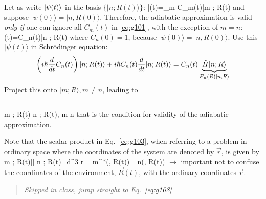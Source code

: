 \documentclass[12pt]{article}
\begin{document}
Let as write $\ket{\psi(t)}$ in the basis $\{|n ; R(t)\rangle\}$:
\be
|\psi(t)\rangle=\sum_{m} C_{m}(t)|m ; R(t)\rangle
\label{eq:g101}
\ee
and suppose $|\psi(0)\rangle=|n, R(0)\rangle$. Therefore, the
adiabatic approximation is valid \textit{only if} one
can ignore all $C_m(t)$ in \eqref{eq:g101}, with the exception
of $m=n$:
\be
|\psi(t)\rangle=C_{n}(t)|n ; R(t)\rangle
\ee
where $C_n(0)=1$, because $|\psi(0)\rangle=|n, R(0)\rangle$.
Use this $|\psi(t)\rangle$ in Schrödinger equation:%
\[
\left(i \hbar \frac{d}{d t} C_{n}(t)\right)
|n ; R(t)\rangle+i \hbar C_{n}(t) \frac{d}{d t}|n ; R(t)\rangle=
C_{n}(t) \underbrace{\hat{H}|n ; R\rangle}%
_{E_n(R)\ket{n,R}}
\]
Project this onto $|m ; R\rangle, m \neq n$,
leading to\\
\rule{\textwidth}{1pt}
\be
\left\langle m ; R(t) \mid {} \mid n ; R(t)\right{}, \quad m \neq n
\label{eq:g103}
\ee
that is the condition for validity of the adiabatic approximation.

Note that the scalar product in Eq.~\eqref{eq:g103}, when
referring to a problem in ordinary space where
the coordinates of the system are denoted by $\vec{r}$,
is given by
\be
\left\langle m ; R(t)\left|\right| n ; R(t)\right\rangle=\int d^{3} r\, \psi_{m}^{*}(, R(t))  \psi_{n}(, R(t))
\ee
$\rightarrow$
important not to confuse the
coordinates of the environment, $\vec{R}(t)$,
with the ordinary coordinates $\vec{r}$.

\begin{quote}\emph{Skipped in class, jump straight to Eq.~\eqref{eq:g108}}\end{quote}
\end{document}
